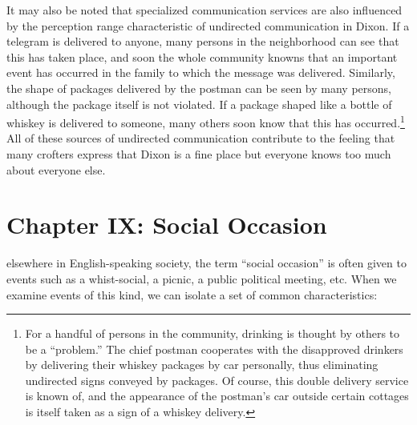 \documentclass[twoside,symmetric,nobib,justified]{tufte-book}
\let\oldchapter\chapter
\def\chapter{%
  \setcounter{footnote}{0}%
  \oldchapter
}
\begin{document}
It may also be noted that specialized communication services are also
influenced by the perception range characteristic of undirected
communication in Dixon. If a telegram is delivered to anyone, many
persons in the neighborhood can see that this has taken place, and soon
the whole community knowns that an important event has occurred in the
family to which the message was delivered. Similarly, the shape of
packages delivered by the postman can be seen by many persons, although
the package itself is not violated. If a package shaped like a bottle of
whiskey is delivered to someone, many others soon know that this has
occurred.\footnote{For a handful of persons in the community, drinking
  is thought by others to be a ``problem.'' The chief postman cooperates
  with the disapproved drinkers by delivering their whiskey packages by
  car personally, thus eliminating undirected signs conveyed by
  packages. Of course, this double delivery service is known of, and the
  appearance of the postman's car outside certain cottages is itself
  taken as a sign of a whiskey delivery.} All of these sources of
undirected communication contribute to the feeling that many crofters
express that Dixon is a fine place but everyone knows too much about
everyone else.

\chapter[CHAPTER IX: SOCIAL OCCASION]{Chapter IX: Social Occasion}
\label{ch:Chapter IX: Social Occasion}

 elsewhere in English-speaking society, the
term ``social occasion'' is often given to events such as a
whist-social, a picnic, a public political meeting, etc. When we examine
events of this kind, we can isolate a set of common characteristics:

\enlargethispage{\baselineskip}
\end{document}
